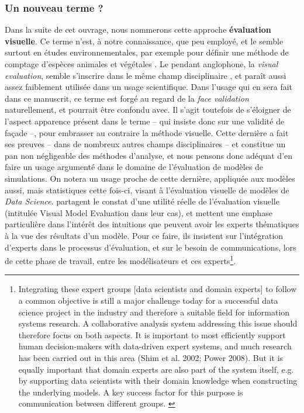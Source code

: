 \subsubsection{Un nouveau terme ?} Dans la suite de cet ouvrage, nous nommerons cette approche \og \textbf{évaluation visuelle}\fg{}.
Ce terme n'est, à notre connaissance, que peu employé, et le semble surtout en études environnementales, par exemple pour définir une méthode de comptage d'espèces animales et végétales \autocite[par exemple][]{harmelin-vivien_evaluation_1985}.
Le pendant anglophone, la \og \textit{visual evaluation}\fg{}, semble s'inscrire dans le même champ disciplinaire \autocite[par exemple][]{horst_assessment_1984}, et paraît aussi assez faiblement utilisée dans un usage scientifique.
Dans l'usage qui en sera fait dans ce manuscrit, ce terme est forgé au regard de la \og \textit{face validation}\fg{} naturellement, et pourrait être confondu avec.
Il s'agit toutefois de s'éloigner de l'aspect \og apparence\fg{} présent dans le terme -- qui insiste donc sur une validité de façade --, pour embrasser au contraire la méthode visuelle.
Cette dernière a fait ses preuves -- dans de nombreux autres champs disciplinaires -- et constitue un pan non négligeable des méthodes d'analyse, et nous pensons donc adéquat d'en faire un usage argumenté dans le domaine de l'évaluation de modèles de simulations.
On notera un usage proche de cette dernière, appliquée aux modèles aussi, mais statistiques cette fois-ci, visant à l'évaluation visuelle de modèles de \og \textit{Data Science}\fg{}.
\textcite{eilers_its_2017} partagent le constat d'une utilité réelle de l'évaluation visuelle (intitulée \og Visual Model Evaluation\fg{} dans leur cas), et mettent une emphase particulière dans l'intérêt des intuitions que peuvent avoir les experts thématiques à la vue des résultats d'un modèle.
Pour ce faire, ils insistent sur l'intégration d'experts dans le processus d'évaluation, et sur le besoin de communications, lors de cette phase de travail, entre les modélisateurs et ces experts\footnote{
	\og Integrating these expert groups [data scientists and domain experts] to follow a common objective is still a major challenge today for a successful data science project in the industry and therefore a suitable field for information systems research.
	A collaborative analysis system addressing this issue should therefore focus on both aspects. It is important to most efficiently support human decision-makers with data-driven expert systems, and much research has been carried out in this area (Shim et al. 2002; Power 2008).
	But it is equally important that domain experts are also part of the system itself, e.g. by supporting data scientists with their domain knowledge when constructing the underlying models.
	A key success factor for this purpose is communication between different groups.\fg{} \autocite[2]{eilers_its_2017}
}.


